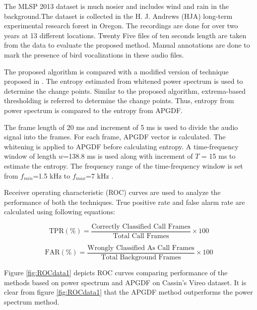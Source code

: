 \documentclass[a4paper]{article}
\begin{document}
The MLSP 2013 dataset \cite{data2} is much nosier and includes
wind and rain in the background.The dataset is collected in the H. J. Andrews (HJA) long-term experimental research forest in Oregon.
The recordings are done for over two years at 13 different locations. Twenty Five files of ten seconds length are taken from the data to evaluate the proposed method. Manual annotations are done to mark the presence of bird vocalizations in these audio files.  


The proposed algorithm is compared with a modified version of technique proposed in \cite{wang2013}. The entropy estimated from whitened power spectrum is used to determine the change points. Similar to the proposed algorithm, extrema-based thresholding is referred to determine the change points. Thus, entropy from power spectrum is compared to the entropy from APGDF.
 
The frame length of 20 ms and increment of  
5 ms is used to divide the audio signal into the frames. For each frame, APGDF vector is calculated.
The whitening is applied to APGDF before calculating entropy.
A time-frequency window of length
$w$=138.8 ms is used along with increment of $T$ = 15 ms to estimate the
entropy.  The frequency range of the time-frequency window is set from $f_{min}$=1.5 kHz to $f_{max}$=7 kHz \cite{wang2013}.  

Receiver operating characteristic (ROC) curves are used to analyze the performance of both the techniques. True positive rate and false alarm rate are calculated using following equations:

\begin{equation}
\text{TPR} (\%)=\frac{\text{Correctly Classified Call Frames}} {\text{Total Call Frames}} \times 100 
\end{equation}




\begin{equation}
\text{FAR} (\%)=\frac{\text{Wrongly Classified As Call Frames}} {\text{Total Background Frames}} \times 100 
\end{equation}



 Figure \ref{fig:ROCdata1} depicts ROC curves comparing performance of the methods based on power spectrum and APGDF on Cassin's Vireo dataset. It is clear from  figure \ref{fig:ROCdata1} that the APGDF method outperforms the power spectrum method.
\end{document}
